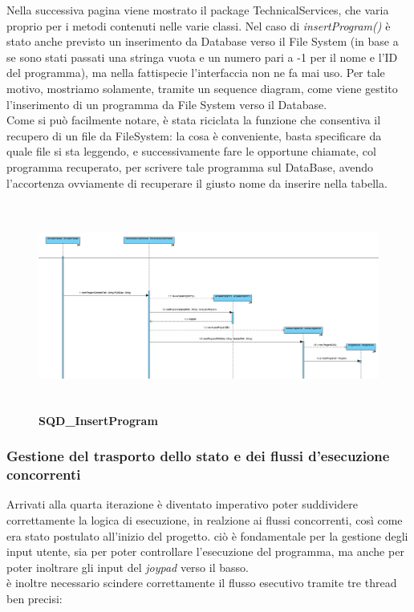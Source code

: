 \documentclass[11pt]{article}
\begin{document}
Nella successiva pagina viene mostrato il package TechnicalServices, che varia proprio per i metodi contenuti nelle varie classi. Nel caso di \emph{insertProgram()} è stato anche previsto un inserimento da Database verso il File System (in base a se sono stati passati una stringa vuota e un numero pari a -1 per il nome e l'ID del programma), ma nella fattispecie l'interfaccia non ne fa mai uso. Per tale motivo, mostriamo solamente, tramite un sequence diagram, come viene gestito l'inserimento di un programma da File System verso il Database.\\
Come si può facilmente notare, è stata riciclata la funzione che consentiva il recupero di un file da FileSystem: la cosa è conveniente, basta specificare da quale file si sta leggendo, e successivamente fare le opportune chiamate, col programma recuperato, per scrivere tale programma sul DataBase, avendo l'accortenza ovviamente di recuperare il giusto nome da inserire nella tabella.
\begin{figure}[h]
\hspace*{-4.2cm}
\centering
\includegraphics[width=600px, height=258px]{SQD_InsertProgram.png}\\
\small\textbf{SQD\_InsertProgram}
\end{figure}
\clearpage
\subsubsection{Gestione del trasporto dello stato e dei flussi d'esecuzione concorrenti}

Arrivati alla quarta iterazione è diventato imperativo poter suddividere correttamente la logica di esecuzione, in realzione ai flussi concorrenti, così come era stato postulato all'inizio del progetto. ciò è fondamentale per la gestione degli input utente, sia per poter controllare l'esecuzione del programma, ma anche per poter inoltrare gli input del \emph{joypad} verso il basso.\\
è inoltre necessario scindere correttamente il flusso esecutivo tramite tre thread ben precisi:
\end{document}
